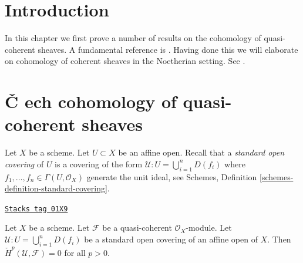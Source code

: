 \section{Introduction}
\label{coherent-section-introduction}
In this chapter we first prove a number of results on the cohomology of
quasi-coherent sheaves. A fundamental reference is \cite{EGA}.
Having done this we will elaborate on cohomology of
coherent sheaves in the Noetherian setting. See \cite{FAC}.

\section{{\v C}
ech cohomology of quasi-coherent sheaves}
\label{coherent-section-cech-quasi-coherent}

Let $X$ be a scheme.
Let $U \subset X$ be an affine open.
Recall that a {\it standard open covering} of $U$ is a covering
of the form $\mathcal{U} : U = \bigcup_{i = 1}^n D(f_i)$
where $f_1, \ldots, f_n \in \Gamma(U, \mathcal{O}_X)$ generate
the unit ideal, see
Schemes, Definition \ref{schemes-definition-standard-covering}.

\begin{lemma}
\label{coherent-lemma-cech-cohomology-quasi-coherent-trivial}
\href{https://stacks.math.columbia.edu/tag/01X9}{\texttt{Stacks tag 01X9}}

Let $X$ be a scheme.
Let $\mathcal{F}$ be a quasi-coherent $\mathcal{O}_X$-module.
Let $\mathcal{U} : U = \bigcup_{i = 1}^n D(f_i)$ be a standard
open covering of an affine open of $X$.
Then $\check{H}^p(\mathcal{U}, \mathcal{F}) = 0$ for
all $p > 0$.
\end{lemma}

